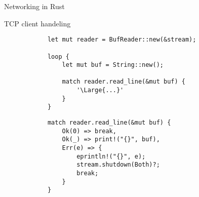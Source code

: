 \begin{frame}[fragile]{Networking in Rust}

    \begin{block}{TCP client handeling}
        \begin{overprint}
            \begin{verbatim}
            let mut reader = BufReader::new(&stream);
            
            loop {
                let mut buf = String::new();
            
                match reader.read_line(&mut buf) {
                    '\Large{...}'
                }
            }
            \end{verbatim}

            \begin{verbatim}
            match reader.read_line(&mut buf) {
                Ok(0) => break,
                Ok(_) => print!("{}", buf),
                Err(e) => {
                    eprintln!("{}", e);
                    stream.shutdown(Both)?;
                    break;
                }
            }
            \end{verbatim}
        \end{overprint}
    \end{block}
\end{frame}
